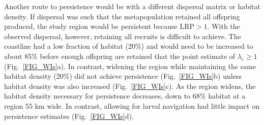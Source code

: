 \documentclass[12pt, oneside]{article}   	%
\begin{document}
Another route to persistence would be with a different dispersal matrix or habitat density. If dispersal was such that the metapopulation retained all offspring produced, the study region would be persistent because $\text{LRP} > 1$. With the observed dispersal, however, retaining all recruits is difficult to achieve. The coastline had a low fraction of habitat (20\%) and would need to be increased to about 85\% before enough offspring are retained that the point estimate of $\lambda_c \geq 1$ (Fig.\ \ref{FIG_WIs}a). In contrast, widening the region while maintaining the same habitat density (20\%) did not achieve persistence (Fig.\ \ref{FIG_WIs}b) unless habitat density was also increased (Fig.\ \ref{FIG_WIs}c). As the region widens, the habitat density necessary for persistence decreases, down to 68\% habitat at a region 55 km wide. In contrast, allowing for larval navigation had little impact on persistence estimates (Fig.\ \ref{FIG_WIs}d).


\end{document}
